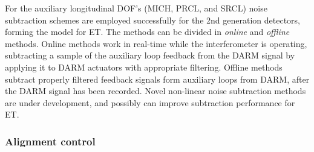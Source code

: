 For the auxiliary longitudinal DOF's (MICH, PRCL, and SRCL) noise subtraction schemes are employed
successfully for the 2nd generation detectors, forming the model for ET.
The methods can be divided in \emph{online} and \emph{offline} methods.
Online methods work in real-time while the interferometer is operating,
subtracting a sample of the auxiliary loop feedback from the DARM signal by
applying it to DARM actuators with appropriate filtering.
Offline methods subtract properly filtered feedback signals form auxiliary loops
from DARM, after the DARM signal has been recorded.
Novel non-linear noise subtraction methods are under development, and possibly can
improve subtraction performance for ET.


















\subsubsection{Alignment control}

